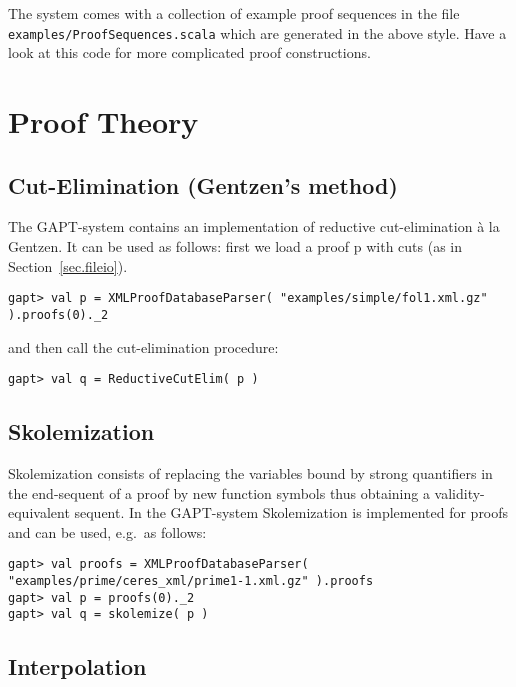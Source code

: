 \documentclass[a4paper,11pt]{article}
\newcommand{\cli}[1]{{\tt {#1}}}
\begin{document}
The system comes with a collection of example proof sequences in the file
\cli{examples/ProofSequences.scala} which are generated in the above style.
Have a look at this code for more complicated proof constructions.


\section{Proof Theory}

\subsection{Cut-Elimination (Gentzen's method)}

The GAPT-system contains an implementation of reductive cut-elimination
\`{a} la Gentzen. It can be used as follows: first we load a proof p
with cuts (as in Section~\ref{sec.fileio}).
%
\begin{lstlisting}
gapt> val p = XMLProofDatabaseParser( "examples/simple/fol1.xml.gz" ).proofs(0)._2
\end{lstlisting}
%
and then call the cut-elimination procedure:
\begin{lstlisting}
gapt> val q = ReductiveCutElim( p )
\end{lstlisting}


\subsection{Skolemization}

Skolemization consists of replacing the variables bound by strong quantifiers in the end-sequent of a proof
by new function symbols thus obtaining a validity-equivalent sequent. In the GAPT-system Skolemization
is implemented for proofs and can be used, e.g.~as follows:
%
\begin{lstlisting}
gapt> val proofs = XMLProofDatabaseParser( "examples/prime/ceres_xml/prime1-1.xml.gz" ).proofs
gapt> val p = proofs(0)._2
gapt> val q = skolemize( p )
\end{lstlisting}


\subsection{Interpolation}
\end{document}
